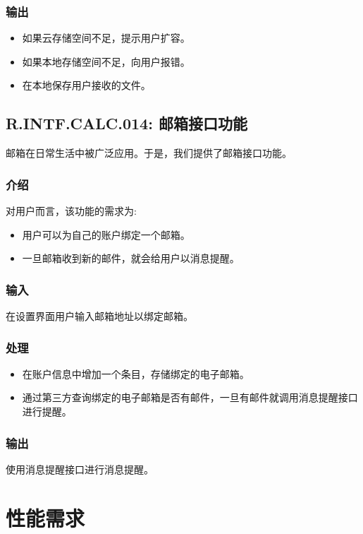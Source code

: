 \subsubsection{输出}
\begin{itemize}
  \item 如果云存储空间不足，提示用户扩容。
  \item 如果本地存储空间不足，向用户报错。
  \item 在本地保存用户接收的文件。
\end{itemize}
\subsection{R.INTF.CALC.014: 邮箱接口功能}
邮箱在日常生活中被广泛应用。于是，我们提供了邮箱接口功能。
\subsubsection{介绍}
对用户而言，该功能的需求为:
\begin{itemize}
  \item 用户可以为自己的账户绑定一个邮箱。
  \item 一旦邮箱收到新的邮件，就会给用户以消息提醒。
\end{itemize}
\subsubsection{输入}
在设置界面用户输入邮箱地址以绑定邮箱。
\subsubsection{处理}
\begin{itemize}
  \item 在账户信息中增加一个条目，存储绑定的电子邮箱。
  \item 通过第三方查询绑定的电子邮箱是否有邮件，一旦有邮件就调用消息提醒接口进行提醒。
\end{itemize}
\subsubsection{输出}
使用消息提醒接口进行消息提醒。

\section{性能需求}
